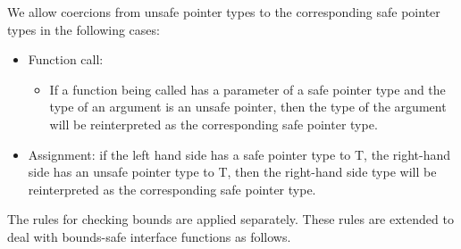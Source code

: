 \documentclass[]{article}
\begin{document}
We allow coercions from unsafe pointer types to the corresponding safe
pointer types in the following cases:

\begin{itemize}
\item
  Function call:

  \begin{itemize}
  \item
    If a function being called has a parameter of a safe pointer type
    and the type of an argument is an unsafe pointer, then the type of
    the argument will be reinterpreted as the corresponding safe pointer
    type.
  \end{itemize}
\item
  Assignment: if the left hand side has a safe pointer type to T, the
  right-hand side has an unsafe pointer type to T, then the right-hand
  side type will be reinterpreted as the corresponding safe pointer
  type.
\end{itemize}

The rules for checking bounds are applied separately. These rules are
extended to deal with bounds-safe interface functions as follows.
\end{document}
